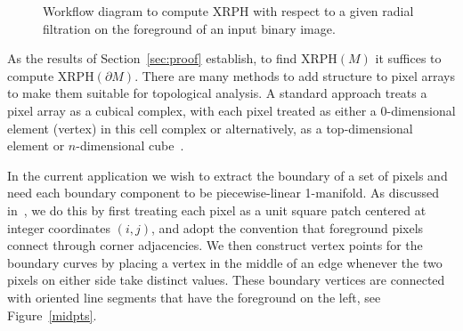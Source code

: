 \documentclass[a4paper,11pt]{article}
\theoremstyle{definition}
\begin{document}
\begin{figure}[h]
    \centering
    \caption{Workflow diagram to compute XRPH with respect to a given radial filtration on the foreground of an input binary image.}
    \label{JM}
\end{figure}

As the results of Section~\ref{sec:proof} establish, to find $\mathrm{XRPH}(M)$ it suffices to compute $\mathrm{XRPH}(\partial M)$. There are many methods to add structure to pixel arrays to make them suitable for topological analysis. 
A standard approach treats a pixel array as a cubical complex, with each pixel treated as either a $0$-dimensional element (vertex) in this cell complex or alternatively, as a top-dimensional element or $n$-dimensional cube~\cite{DualDigitalImage}.   

In the current application we wish to extract the boundary of a set of pixels and need each boundary component to be piecewise-linear 1-manifold. As discussed in~\cite{KT2022}, we do this by first treating each pixel as a unit square patch centered at integer coordinates $(i,j)$, and adopt the convention that foreground pixels connect through corner adjacencies. We then construct vertex points for the boundary curves by placing a vertex in the middle of an edge whenever the two pixels on either side take distinct values. These boundary vertices are connected with oriented line segments that have the foreground on the left, see Figure~\ref{midpts}.
\end{document}
